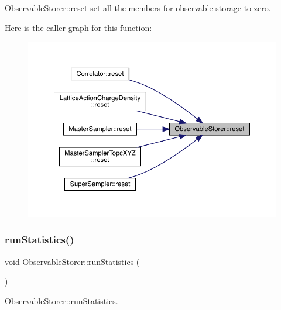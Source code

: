 \mbox{\hyperlink{class_observable_storer_a7b6285a532d796816d75262f91d43dad}{Observable\+Storer\+::reset}} set all the members for observable storage to zero. 

Here is the caller graph for this function\+:\nopagebreak
\begin{figure}[H]
\begin{center}
\leavevmode
\includegraphics[width=350pt]{class_observable_storer_a7b6285a532d796816d75262f91d43dad_icgraph}
\end{center}
\end{figure}
\mbox{\label{class_observable_storer_a41b3756b423d31c6535d2981ef92d1a1}} 
\subsubsection{\texorpdfstring{runStatistics()}{runStatistics()}}
{\footnotesize\ttfamily void Observable\+Storer\+::run\+Statistics (\begin{DoxyParamCaption}{ }\end{DoxyParamCaption})}



\mbox{\hyperlink{class_observable_storer_a41b3756b423d31c6535d2981ef92d1a1}{Observable\+Storer\+::run\+Statistics}}. 

